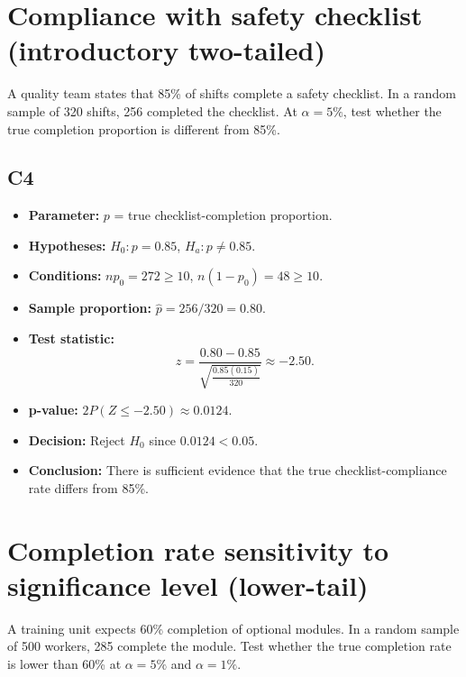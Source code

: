 \begin{center}
\end{center}


\section{Compliance with safety checklist (introductory two-tailed)}
A quality team states that 85\% of shifts complete a safety checklist. In a random sample of 320 shifts, 256 completed the checklist. At \(\alpha=5\%\), test whether the true completion proportion is different from 85\%.

\subsection*{C4}
\begin{itemize}
    \item \textbf{Parameter:} \(p\) = true checklist-completion proportion.
    \item \textbf{Hypotheses:} \(H_0\colon p=0.85\), \(H_a\colon p\ne0.85\).
    \item \textbf{Conditions:} \(np_0=272\ge10\), \(n(1-p_0)=48\ge10\).
    \item \textbf{Sample proportion:} \(\hat p=256/320=0.80\).
    \item \textbf{Test statistic:}
    \[
    z=\frac{0.80-0.85}{\sqrt{\frac{0.85(0.15)}{320}}}\approx -2.50.
    \]
    \item \textbf{p-value:} \(2P(Z\le -2.50)\approx 0.0124\).
    \item \textbf{Decision:} Reject \(H_0\) since \(0.0124<0.05\).
    \item \textbf{Conclusion:} There is sufficient evidence that the true checklist-compliance rate differs from 85\%.
\end{itemize}

\begin{center}
\end{center}


\section{Completion rate sensitivity to significance level (lower-tail)}
A training unit expects 60\% completion of optional modules. In a random sample of 500 workers, 285 complete the module. Test whether the true completion rate is lower than 60\% at \(\alpha=5\%\) and \(\alpha=1\%\).

